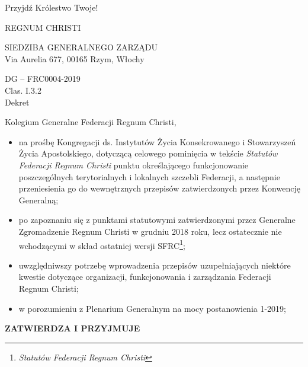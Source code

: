 \begin{framed}
	\setlength{
	\parskip}{.5em} 
	\begin{footnotesize}
		\begin{center}
			Przyjdź Królestwo Twoje!
			
			REGNUM CHRISTI
			
			{\tiny SIEDZIBA GENERALNEGO ZARZĄDU\\
			Via Aurelia 677, 00165 Rzym, Włochy} 
		\end{center}
		
		DG – FRC0004-2019\\
		Clas. I.3.2\\
		Dekret
		
		Kolegium Generalne Federacji Regnum Christi,
		\begin{itemize}
			
			\item na prośbę Kongregacji ds. Instytutów Życia Konsekrowanego i Stowarzyszeń Życia Apostolskiego, dotyczącą celowego pominięcia w tekście {\em Statutów Federacji Regnum Christi} punktu określającego funkcjonowanie poszczególnych terytorialnych i lokalnych szczebli Federacji, a następnie przeniesienia go do wewnętrznych przepisów zatwierdzonych przez Konwencję Generalną;
			
			\item po zapoznaniu się z punktami statutowymi zatwierdzonymi przez Generalne Zgromadzenie Regnum Christi w grudniu 2018 roku, lecz ostatecznie nie wchodzącymi w skład ostatniej wersji SFRC\footnote{\em Statutów Federacji Regnum Christi};
			
			\item uwzględniwszy potrzebę wprowadzenia przepisów uzupełniających niektóre kwestie dotyczące organizacji, funkcjonowania i zarządzania Federacji Regnum Christi;
			
			\item w porozumieniu z Plenarium Generalnym na mocy postanowienia 1-2019; 
		\end{itemize}
		\begin{center}
			\bf{}ZATWIERDZA I PRZYJMUJE
		\end{center}
		

\end{footnotesize}
\end{framed}
